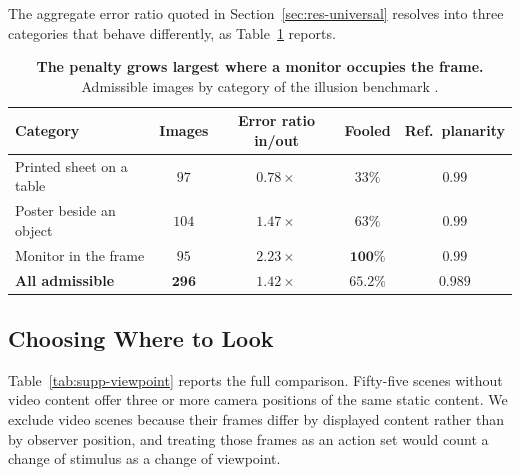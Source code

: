 \documentclass{article} %
\theoremstyle{defstyle}
\theoremstyle{plain}
\begin{document}
The aggregate error ratio quoted in Section~\ref{sec:res-universal} resolves into three
categories that behave differently, as Table~\ref{tab:supp-category} reports.

\begin{table}[!ht]
\caption{\textbf{The penalty grows largest where a monitor occupies the frame.} Admissible images by
category of the illusion benchmark \citep{illusion2025}.}
\label{tab:supp-category}
\begin{center}
\footnotesize
\begin{tabular}{lcccc}
\toprule
\textbf{Category} & \textbf{Images} & \textbf{Error ratio in/out} &
\textbf{Fooled} & \textbf{Ref.\ planarity} \\
\midrule
Printed sheet on a table & $97$ & $0.78\times$ & $33\%$ & $0.99$ \\
Poster beside an object  & $104$ & $1.47\times$ & $63\%$ & $0.99$ \\
Monitor in the frame & $95$ & $\mathbf{2.23\times}$ & $\mathbf{100\%}$ & $0.99$ \\
\midrule
\textbf{All admissible}  & $\mathbf{296}$ & $\mathbf{1.42\times}$ & $\mathbf{65.2\%}$ & $\mathbf{0.989}$ \\
\bottomrule
\end{tabular}
\end{center}
\end{table}

\subsection{Choosing Where to Look}
\label{sec:supp-viewpoint}

Table~\ref{tab:supp-viewpoint} reports the full comparison. Fifty-five scenes without video
content offer three or more camera positions of the same static content. We exclude video
scenes because their frames differ by displayed content rather than by observer position,
and treating those frames as an action set would count a change of stimulus as a change of
viewpoint.
\end{document}
